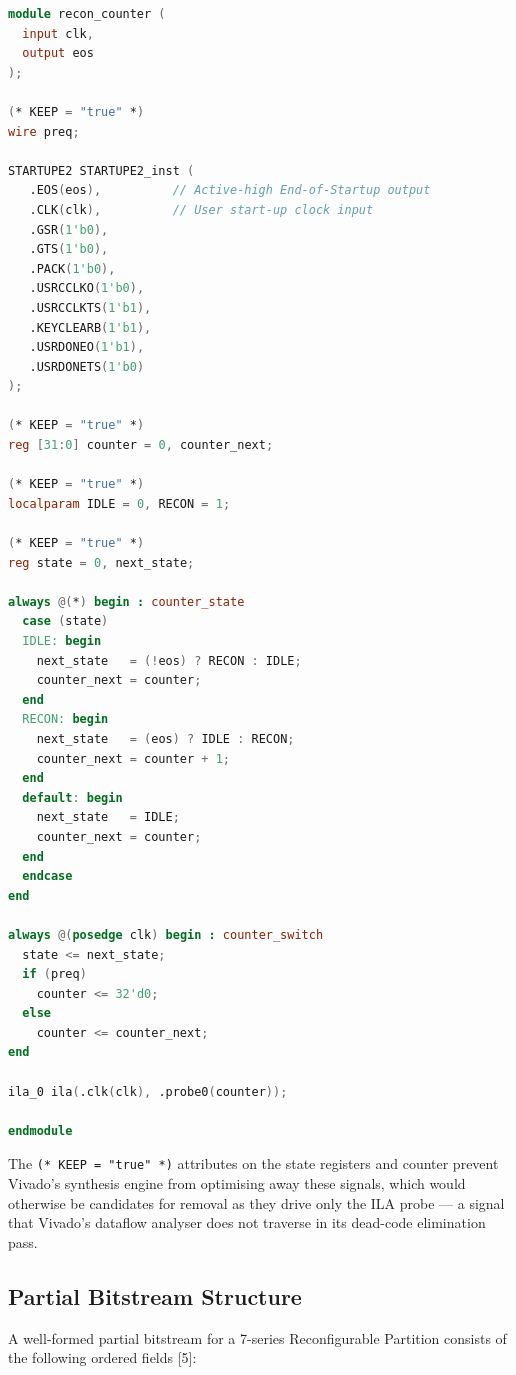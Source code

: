 \begin{lstlisting}[style=mystyle, language=Verilog]
module recon_counter (
  input clk,
  output eos
);

(* KEEP = "true" *)
wire preq;

STARTUPE2 STARTUPE2_inst (
   .EOS(eos),          // Active-high End-of-Startup output
   .CLK(clk),          // User start-up clock input
   .GSR(1'b0),
   .GTS(1'b0),
   .PACK(1'b0),
   .USRCCLKO(1'b0),
   .USRCCLKTS(1'b1),
   .KEYCLEARB(1'b1),
   .USRDONEO(1'b1),
   .USRDONETS(1'b0)
);

(* KEEP = "true" *)
reg [31:0] counter = 0, counter_next;

(* KEEP = "true" *)
localparam IDLE = 0, RECON = 1;

(* KEEP = "true" *)
reg state = 0, next_state;

always @(*) begin : counter_state
  case (state)
  IDLE: begin
    next_state   = (!eos) ? RECON : IDLE;
    counter_next = counter;
  end
  RECON: begin
    next_state   = (eos) ? IDLE : RECON;
    counter_next = counter + 1;
  end
  default: begin
    next_state   = IDLE;
    counter_next = counter;
  end
  endcase
end

always @(posedge clk) begin : counter_switch
  state <= next_state;
  if (preq)
    counter <= 32'd0;
  else
    counter <= counter_next;
end

ila_0 ila(.clk(clk), .probe0(counter));

endmodule
\end{lstlisting}

The \texttt{(* KEEP = "true" *)} attributes on the state registers and counter prevent Vivado's synthesis engine from optimising away these signals, which would otherwise be candidates for removal as they drive only the ILA probe — a signal that Vivado's dataflow analyser does not traverse in its dead-code elimination pass.

\subsection{Partial Bitstream Structure}

A well-formed partial bitstream for a 7-series Reconfigurable Partition consists of the following ordered fields [5]:

